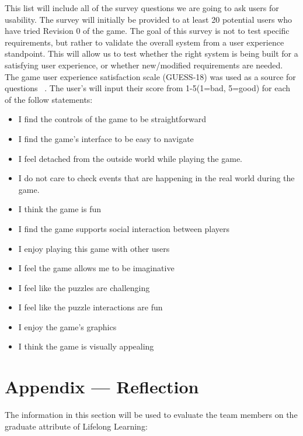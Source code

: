 \documentclass[12pt, titlepage]{article}
\begin{document}
This list will include all of the survey questions we are going to ask users for usability. The survey will initially be provided to at least 20 potential users who have tried Revision 0 of the game. The goal of this survey is not to test specific requirements, but rather to validate the overall system from a user experience standpoint. This will allow us to test whether the right system is being built for a satisfying user experience, or whether new/modified requirements are needed. The game user experience satisfaction scale (GUESS-18) was used as a source for questions ~\citep{GUESS-18}. The user's will input their score from 1-5(1=bad, 5=good) for each of the follow statements:
\begin{itemize}
    \item I find the controls of the game to be straightforward
    \item I find the game's interface to be easy to navigate
    \item I feel detached from the outside world while playing the game.
    \item I do not care to check events that are happening in the real world during the game.
    \item I think the game is fun
    \item I find the game supports social interaction between players
    \item I enjoy playing this game with other users
    \item I feel the game allows me to be imaginative
    \item I feel like the puzzles are challenging
    \item I feel like the puzzle interactions are fun
    \item I enjoy the game's graphics
    \item I think the game is visually appealing
\end{itemize}


\newpage{}
\section*{Appendix --- Reflection}


The information in this section will be used to evaluate the team members on the
graduate attribute of Lifelong Learning:
\end{document}
